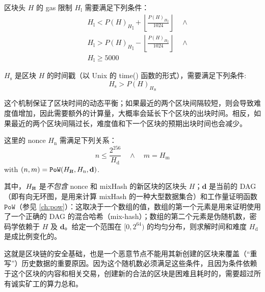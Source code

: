 \documentclass[9pt,oneside]{amsart}
\makeatletter
\newcommand{\linkdest}[1]{\Hy@raisedlink{\hypertarget{#1}{}}}
\newcommand{\hcancel}[1]{%
    \tikz[baseline=(tocancel.base)]{
        \node[inner sep=0pt,outer sep=0pt] (tocancel) {#1};
        \draw[black] (tocancel.south west) -- (tocancel.north east);
    }%
}%
\makeatother
\begin{document}
\begin{multicols}{2}
\hypertarget{block_gas_limit_H__l}{}区块头 $H$ 的 gas 限制 $H_{\mathrm{l}}$ 需要满足下列条件：
\begin{eqnarray}
& & H_{\mathrm{l}} < {P(H)_{H}}_{\mathrm{l}} + \left\lfloor\frac{{P(H)_{H}}_{\mathrm{l}}}{1024}\right\rfloor \quad \wedge \\
\nonumber& & H_{\mathrm{l}} > {P(H)_{H}}_{\mathrm{l}} - \left\lfloor\frac{{P(H)_{H}}_{\mathrm{l}}}{1024}\right\rfloor \quad \wedge \\
\nonumber& & H_{\mathrm{l}} \geqslant 5000
\end{eqnarray}

\hypertarget{block_timestamp_H__s}{}$H_{\mathrm{s}}$ 是区块 $H$ 的时间戳（以 Unix 的 time() 函数的形式），需要满足下列条件:
\begin{equation}
H_{\mathrm{s}} > {P(H)_{H}}_{\mathrm{s}}
\end{equation}

这个机制保证了区块时间的动态平衡；如果最近的两个区块间隔较短，则会导致难度值增加，因此需要额外的计算量，大概率会延长下个区块的出块时间。相反，如果最近的两个区块间隔过长，难度值和下一个区块的预期出块时间也会减少。

这里的 nonce \linkdest{H__n}\hyperlink{block_nonce_H__n}{$H_{\mathrm{n}}$} 需满足下列关系：
\begin{equation}
n \leqslant \frac{2^{256}}{H_{\mathrm{d}}} \quad \wedge \quad m = H_{\mathrm{m}}
\end{equation}
with $(n, m) = \mathtt{PoW}(H_{\hcancel{n}}, H_{\mathrm{n}}, \mathbf{d})$.

\hypertarget{block_header_without_nonce_and_mixmash_h__cancel_n}{}\linkdest{H_cancel_n}其中，$H_{\hcancel{n}}$ 是\textit{不包含} nonce 和 mixHash 的新区块的区块头 $H$；$\mathbf{d}$ 是当前的 DAG（即有向无环图，是用来计算 mixHash 的一种大型数据集合）和工作量证明函数 $\mathtt{PoW}$（参见 \ref{ch:pow}）：这取决于一个数组的值，数组的第一个元素是用来证明使用了一个正确的 DAG 的混合哈希（mix-hash）；数组的第二个元素是伪随机数，密码学依赖于 $H$ 及 $\mathbf{d}$。给定一个范围在 $[0, 2^{64})$ 的均匀分布，则求解时间和难度 $H_{\mathrm{d}}$ 是成比例变化的。

这就是区块链的安全基础，也是一个恶意节点不能用其新创建的区块来覆盖（“重写”）历史数据的重要原因。因为这个随机数必须满足这些条件，且因为条件依赖于这个区块的内容和相关交易，创建新的合法的区块是困难且耗时的，需要超过所有诚实矿工的算力总和。


\end{multicols}
\end{document}
